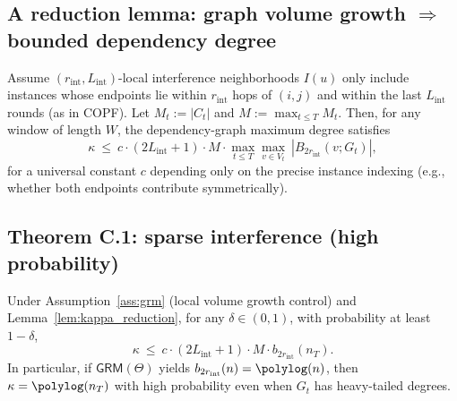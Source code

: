 \documentclass[12pt,a4paper]{article}
\begin{document}

\subsection{A reduction lemma: graph volume growth $\Rightarrow$ bounded dependency degree}
\label{subsec:kappa_reduction}

\begin{lemma}
\label{lem:kappa_reduction}
Assume $(r_{\mathrm{int}},L_{\mathrm{int}})$-local interference neighborhoods $I(u)$
only include instances whose endpoints lie within $r_{\mathrm{int}}$ hops of $(i,j)$
and within the last $L_{\mathrm{int}}$ rounds (as in COPF).
Let $M_t:=|C_t|$ and $M:=\max_{t\le T} M_t$.
Then, for any window of length $W$,
the dependency-graph maximum degree satisfies
\[
\kappa \ \le\ c \cdot (2L_{\mathrm{int}}+1)\cdot M \cdot
\max_{t\le T}\max_{v\in V_t}\ |B_{2r_{\mathrm{int}}}(v;G_t)|,
\]
for a universal constant $c$ depending only on the precise instance indexing
(e.g., whether both endpoints contribute symmetrically).
\end{lemma}


\subsection{Theorem C.1: sparse interference (high probability)}
\label{subsec:C1}

\begin{theorem}
\label{thm:C1_sparse_interference}
Under Assumption~\ref{ass:grm} (local volume growth control) and Lemma~\ref{lem:kappa_reduction},
for any $\delta\in(0,1)$, with probability at least $1-\delta$,
\[
\kappa \ \le\ c\cdot(2L_{\mathrm{int}}+1)\cdot M \cdot b_{2r_{\mathrm{int}}}(n_T).
\]
In particular, if $\mathsf{GRM}(\Theta)$ yields $b_{2r_{\mathrm{int}}}(n)=\polylog(n)$,
then $\kappa=\polylog(n_T)$ with high probability even when $G_t$ has heavy-tailed degrees.
\end{theorem}

\end{document}
